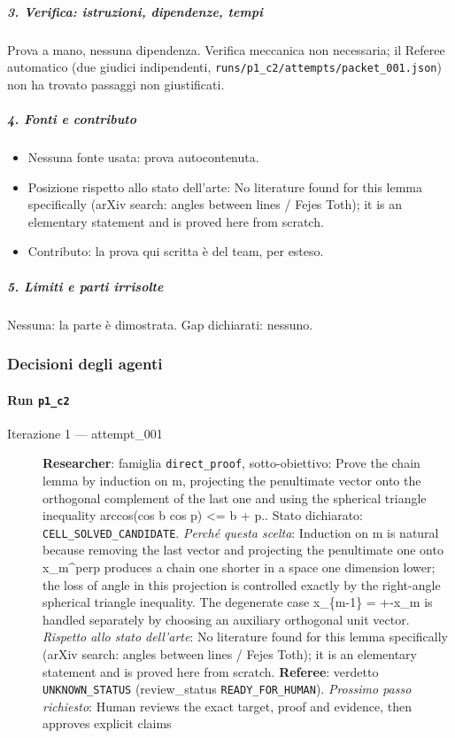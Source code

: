 \documentclass[11pt,a4paper]{article}
\providecommand{\tightlist}{\setlength{\itemsep}{0pt}\setlength{\parskip}{0pt}}
\begin{document}
\subparagraph{3. Verifica: istruzioni, dipendenze,
tempi}\label{verifica-istruzioni-dipendenze-tempi}

Prova a mano, nessuna dipendenza. Verifica meccanica non necessaria; il
Referee automatico (due giudici indipendenti,
\texttt{runs/p1\_c2/attempts/packet\_001.json}) non ha trovato passaggi
non giustificati.

\subparagraph{4. Fonti e contributo}\label{fonti-e-contributo}

\begin{itemize}
\tightlist
\item
  Nessuna fonte usata: prova autocontenuta.
\item
  Posizione rispetto allo stato dell'arte: No literature found for this
  lemma specifically (arXiv search: angles between lines / Fejes Toth);
  it is an elementary statement and is proved here from scratch.
\item
  Contributo: la prova qui scritta è del team, per esteso.
\end{itemize}

\subparagraph{5. Limiti e parti
irrisolte}\label{limiti-e-parti-irrisolte}

Nessuna: la parte è dimostrata. Gap dichiarati: nessuno.

\subsubsection{Decisioni degli agenti}
\paragraph{Run \texttt{p1\_c2}}
\begin{description}
\item[Iterazione 1 — attempt\_001]
\textbf{Researcher}: famiglia \texttt{direct\_proof}, sotto-obiettivo: Prove the chain lemma by induction on m, projecting the penultimate vector onto the orthogonal complement of the last one and using the spherical triangle inequality arccos(cos b cos p) \textless{}= b + p.. Stato dichiarato: \texttt{CELL\_SOLVED\_CANDIDATE}.
\emph{Perché questa scelta}: Induction on m is natural because removing the last vector and projecting the penultimate one onto x\_m\textasciicircum{}perp produces a chain one shorter in a space one dimension lower; the loss of angle in this projection is controlled exactly by the right-angle spherical triangle inequality. The degenerate case x\_\{m-1\} = +-x\_m is handled separately by choosing an auxiliary orthogonal unit vector.
\emph{Rispetto allo stato dell'arte}: No literature found for this lemma specifically (arXiv search: angles between lines / Fejes Toth); it is an elementary statement and is proved here from scratch.
\textbf{Referee}: verdetto \texttt{UNKNOWN\_STATUS} (review\_status \texttt{READY\_FOR\_HUMAN}).
\emph{Prossimo passo richiesto}: Human reviews the exact target, proof and evidence, then approves explicit claims
\end{description}
\end{document}
